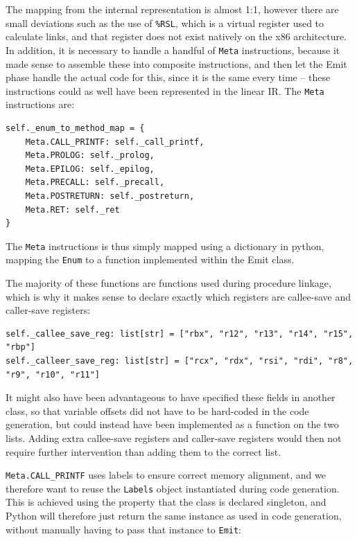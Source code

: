 The mapping from the internal representation is almost 1:1, however there are small deviations such as the use of \texttt{\%RSL}, which is a virtual register used to calculate links, and that register does not exist natively on the x86 architecture. In addition, it is necessary to handle a handful of \texttt{Meta} instructions, because it made sense to assemble these into composite instructions, and then let the Emit phase handle the actual code for this, since it is the same every time -- these instructions could as well have been represented in the linear IR. The \texttt{Meta} instructions are:

\begin{verbatim}
self._enum_to_method_map = {
    Meta.CALL_PRINTF: self._call_printf,
    Meta.PROLOG: self._prolog,
    Meta.EPILOG: self._epilog,
    Meta.PRECALL: self._precall,
    Meta.POSTRETURN: self._postreturn,
    Meta.RET: self._ret
}
\end{verbatim}

The \texttt{Meta} instructions is thus simply mapped using a dictionary in python, mapping the \texttt{Enum} to a function implemented within the Emit class.

The majority of these functions are functions used during procedure linkage, which is why it makes sense to declare exactly which registers are callee-save and caller-save registers:

\begin{verbatim}
self._callee_save_reg: list[str] = ["rbx", "r12", "r13", "r14", "r15", "rbp"]
self._calleer_save_reg: list[str] = ["rcx", "rdx", "rsi", "rdi", "r8", "r9", "r10", "r11"]
\end{verbatim}

It might also have been advantageous to have specified these fields in another class, so that variable offsets did not have to be hard-coded in the code generation, but could instead have been implemented as a function on the two lists. Adding extra callee-save registers and caller-save registers would then not require further intervention than adding them to the correct list.

\texttt{Meta.CALL\_PRINTF} uses labels to ensure correct memory alignment, and we therefore want to reuse the \texttt{Labels} object instantiated during code generation. This is achieved using the property that the class is declared singleton, and Python will therefore just return the same instance as used in code generation, without manually having to pass that instance to \texttt{Emit}:

